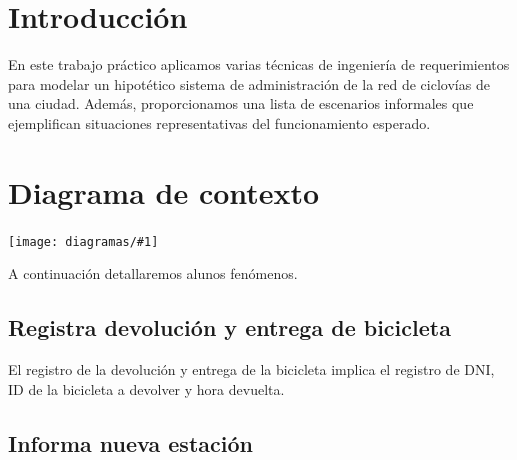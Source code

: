 \documentclass[a4paper, 10pt, twoside]{article}
\newcommand{\diagramah}[1]{
  \texttt{[image: diagramas/\#1]}
}
\begin{document}
\newpage




\tableofcontents

\newpage




\section{Introducción}

En este trabajo práctico aplicamos varias técnicas de ingeniería de requerimientos para modelar un hipotético sistema de administración de la red de ciclovías de una ciudad. Además, proporcionamos una lista de escenarios informales que ejemplifican situaciones representativas del funcionamiento esperado.




\section{Diagrama de contexto}

\diagramah{contexto}

A continuación detallaremos alunos fenómenos.

\subsection{Registra devolución y entrega de bicicleta}

El registro de la devolución y entrega de la bicicleta implica el registro de DNI, ID de la bicicleta a devolver y hora devuelta.

\subsection{Informa nueva estación}
\end{document}
